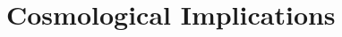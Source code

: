 \documentclass[twocolumn]{aastex631}
\begin{document}
\section{Cosmological Implications}
\label{sec:cumulation+rate}






\end{document}
